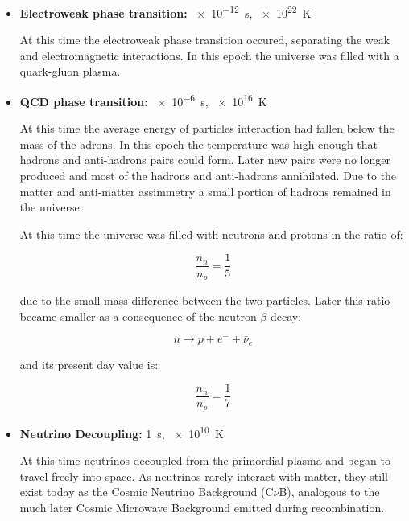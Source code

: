 \begin{itemize}
        \item \textbf{Electroweak phase transition:} \SI{e-12}{\second},
        \SI{e22}{\kelvin}

        At this time the electroweak phase transition occured, separating
        the weak and electromagnetic interactions. In this epoch the
        universe was filled with a quark-gluon plasma.
        \item \textbf{QCD phase transition:} \SI{e-6}{\second},
        \SI{e16}{\kelvin}

        At this time the average energy of particles interaction had fallen
        below the mass of the adrons. In this epoch the temperature was
        high enough that hadrons and anti-hadrons pairs could form. Later
        new pairs were no longer produced and most of the hadrons and
        anti-hadrons annihilated. Due to the matter and anti-matter
        assimmetry a small portion of hadrons remained in the universe. 

        At this time the universe was filled with neutrons and protons in
        the ratio of:

        \begin{equation}
                \frac{n_n}{n_p} = \frac{1}{5} 
        \end{equation}

        due to the small mass difference between the two particles. Later
        this ratio became smaller as a consequence of the neutron $\beta$
        decay:

        \begin{equation}
                n \rightarrow p + e^- + \bar\nu_e 
        \end{equation}

        and its present day value is:

        \begin{equation}
                \frac{n_n}{n_p} = \frac{1}{7} 
        \end{equation}

        \item \textbf{Neutrino Decoupling:} \SI{1}{\second},
        \SI{e10}{\kelvin}

        At this time neutrinos decoupled from the primordial plasma and
        began to travel freely into space. As neutrinos rarely interact
        with matter, they still exist today as the Cosmic
        Neutrino Background (C$\nu$B), analogous to the much later Cosmic
        Microwave Background emitted during recombination.


\end{itemize}
